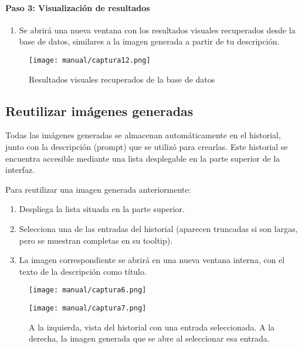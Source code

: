 \paragraph{\textbf{Paso 3: Visualización de resultados}}
\begin{enumerate}
    \item Se abrirá una nueva ventana con los resultados visuales recuperados desde la base de datos, similares a la imagen generada a partir de tu descripción.
\end{enumerate}

\begin{figure}[H]
    \centering
    \texttt{[image: manual/captura12.png]}
    \caption{Resultados visuales recuperados de la base de datos}
\end{figure}

\subsection{Reutilizar imágenes generadas}
Todas las imágenes generadas se almacenan automáticamente en el historial, junto con la descripción (prompt) que se utilizó para crearlas. Este historial se encuentra accesible mediante una lista desplegable en la parte superior de la interfaz.

Para reutilizar una imagen generada anteriormente:
\begin{enumerate}
    \item Despliega la lista situada en la parte superior.
    \item Selecciona una de las entradas del historial (aparecen truncadas si son largas, pero se muestran completas en su tooltip).
    \item La imagen correspondiente se abrirá en una nueva ventana interna, con el texto de la descripción como título.
\end{enumerate}

\begin{figure}[H]
    \centering
    \begin{minipage}[t]{0.48\textwidth}
        \centering
        \texttt{[image: manual/captura6.png]}
    \end{minipage}
    \hfill
    \begin{minipage}[t]{0.48\textwidth}
        \centering
        \texttt{[image: manual/captura7.png]}
    \end{minipage}
    \caption{A la izquierda, vista del historial con una entrada seleccionada. A la derecha, la imagen generada que se abre al seleccionar esa entrada.}
    \label{fig:historial}
\end{figure}


